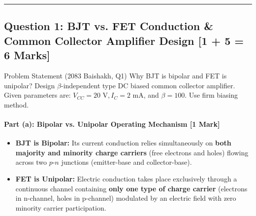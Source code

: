 \documentclass[11pt,a4paper,oneside]{book}
\begin{document}
\vspace{0.6cm}
\hrule
\vspace{0.6cm}

\subsection{Question 1: BJT vs. FET Conduction \& Common Collector Amplifier Design [1 + 5 = 6 Marks]}
\begin{questionbox}{Problem Statement (2083 Baishakh, Q1)}
Why BJT is bipolar and FET is unipolar? Design $\beta$-independent type DC biased common collector amplifier. Given parameters are: $V_{CC} = 20\text{ V}, I_C = 2\text{ mA}$, and $\beta = 100$. Use firm biasing method.
\end{questionbox}

\paragraph{Part (a): Bipolar vs. Unipolar Operating Mechanism [1 Mark]}
\begin{itemize}[leftmargin=1.5em]
  \item \textbf{BJT is Bipolar:} Its current conduction relies simultaneously on \textbf{both majority and minority charge carriers} (free electrons and holes) flowing across two $p$-$n$ junctions (emitter-base and collector-base).
  \item \textbf{FET is Unipolar:} Electric conduction takes place exclusively through a continuous channel containing \textbf{only one type of charge carrier} (electrons in n-channel, holes in p-channel) modulated by an electric field with zero minority carrier participation.
\end{itemize}
\end{document}
